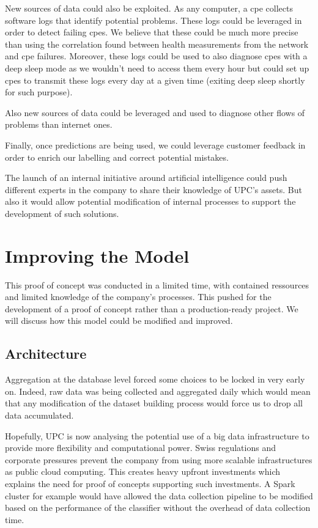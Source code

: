 New sources of data could also be exploited. As any computer, a \acrshort{cpe} collects software logs that identify potential problems. These logs could be leveraged in order to detect failing \acrshort{cpe}s. We believe that these could be much more precise than using the correlation found between health measurements from the network and \acrshort{cpe} failures. Moreover, these logs could be used to also diagnose \acrshort{cpe}s with a deep sleep mode as we wouldn't need to access them every hour but could set up \acrshort{cpe}s to transmit these logs every day at a given time (exiting deep sleep shortly for such purpose).

Also new sources of data could be leveraged and used to diagnose other flows of problems than internet ones. 

Finally, once predictions are being used, we could leverage customer feedback in order to enrich our labelling and correct potential mistakes. 

\vspace{\baselineskip}
The launch of an internal initiative around artificial intelligence could push different experts in the company to share their knowledge of UPC's assets. But also it would allow potential modification of internal processes to support the development of such solutions.


\section{Improving the Model}
This proof of concept was conducted in a limited time, with contained ressources and limited knowledge of the company's processes. This pushed for the development of a proof of concept rather than a production-ready project. We will discuss how this model could be modified and improved.

\subsection{Architecture}
Aggregation at the database level forced some choices to be locked in very early on. Indeed, raw data was being collected and aggregated daily which would mean that any modification of the dataset building process would force us to drop all data accumulated. 

Hopefully, UPC is now analysing the potential use of a big data infrastructure to provide more flexibility and computational power. Swiss regulations and corporate pressures prevent the company from using more scalable infrastructures as public cloud computing. This creates heavy upfront investments which explains the need for proof of concepts supporting such investments. A Spark cluster for example would have allowed the data collection pipeline to be modified based on the performance of the classifier without the overhead of data collection time. 

